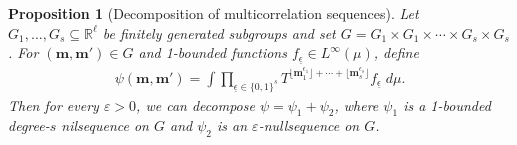\documentclass[11pt]{amsart}
\newtheorem{proposition}[lemma]{Proposition}
\theoremstyle{definition}
\newcommand{\R}{{\mathbb R}}
\newcommand{\bm}{{\mathbf{m}}}
\newcommand{\veps}{\varepsilon}
\newcommand{\eps}{\epsilon}
\newcommand{\ueps}{{\underline{\epsilon}}}
\newcommand{\1}{{\mathbf{1}}}
\newcommand{\sfloor}[1]{{\lfloor #1 \rfloor}}
\begin{document}
\begin{proposition}[Decomposition of multicorrelation sequences]\label{P: multicorrelation}
    Let $G_1, \ldots, G_s\subseteq\R^\ell$ be finitely generated subgroups and set $G = G_1\times G_1 \times \cdots \times G_s\times G_s$. For $(\bm,\bm')\in G$ and  1-bounded functions $f_\ueps\in L^\infty(\mu)$, define 
    \begin{align*}
        \psi(\bm, \bm')= \int \prod_{\ueps\in\{0,1\}^s}T^{\sfloor{\bm_1^{\eps_1}}+\cdots + \sfloor{\bm_s^{\eps_s}}} f_\ueps\; d\mu.
    \end{align*}
    Then for every $\veps>0$, we can decompose $\psi = \psi_1 + \psi_2$, where $\psi_1$ is a 1-bounded degree-$s$ nilsequence on $G$ and $\psi_2$ is an $\veps$-nullsequence on $G$.
\end{proposition}
\end{document}
